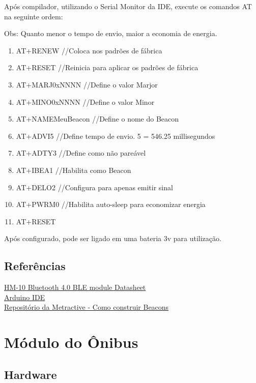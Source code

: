 \documentclass[
	12pt,				%
	oneside,			%
	a4paper,			%
	brazil				%
]{abntex2}
\begin{document}


Após compilador, utilizando o Serial Monitor da IDE, execute os comandos AT na seguinte ordem:

Obs: Quanto menor o tempo de envio, maior a economia de energia.

\begin{enumerate}
\item AT+RENEW //Coloca nos padrões de fábrica
\item AT+RESET //Reinicia para aplicar os padrões de fábrica
\item AT+MARJ0xNNNN //Define o valor Marjor
\item AT+MINO0xNNNN //Define o valor Minor
\item AT+NAMEMeuBeacon //Define o nome do Beacon
\item AT+ADVI5 //Define tempo de envio. 5 = 546.25 millisegundos
\item AT+ADTY3 //Define como não pareável
\item AT+IBEA1 //Habilita como Beacon
\item AT+DELO2 //Configura para apenas emitir sinal
\item AT+PWRM0 //Habilita auto-sleep para economizar energia
\item AT+RESET
\end{enumerate}


Após configurado, pode ser ligado em uma bateria 3v para utilização.

\subsection{Referências}

\href{ftp://imall.iteadstudio.com/Modules/IM130614001_Serial_Port_BLE_Module_Master_Slave_HM-10/DS_IM130614001_Serial_Port_BLE_Module_Master_Slave_HM-10.pdf}{HM-10 Bluetooth 4.0 BLE module Datasheet}
\\
\href{https://www.arduino.cc/en/main/software}{Arduino IDE}
\\
\href{https://github.com/metractive/beacon-study}{Repositório da Metractive - Como construir Beacons}

\section{Módulo do Ônibus}

\subsection{Hardware}
\end{document}
